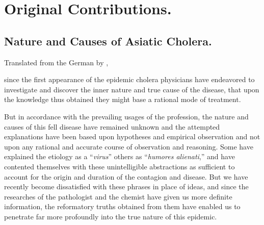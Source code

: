 
\section*{Original Contributions.}

\subsection*{Nature and Causes of Asiatic Cholera.}


\footnotesize
\begin{center}Translated from the German by , \md\end{center}
\normalsize

 since the first appearance of the epidemic cholera physicians
have endeavored to investigate and discover the inner nature and true
cause of the disease, that upon the knowledge thus obtained they might
base a rational mode of treatment.

But in accordance with the prevailing usages of the profession, the
nature and causes of this fell disease have remained unknown and the
attempted explanations have been based upon hypotheses and empirical
observation and not upon any rational and accurate course of
observation and reasoning. Some have explained the etiology as
a ``\textit{virus}'' others as ``\textit{humores alienati},'' and have contented themselves
with these unintelligible abstractions as sufficient to account for
the origin and duration of the contagion and disease. But we have
recently become dissatisfied with these phrases in place of ideas, and
since the researches of the pathologist and the chemist have given us
more definite information, the reformatory truths obtained from them
have enabled us to penetrate far more profoundly into the true nature
of this epidemic.
\endinput